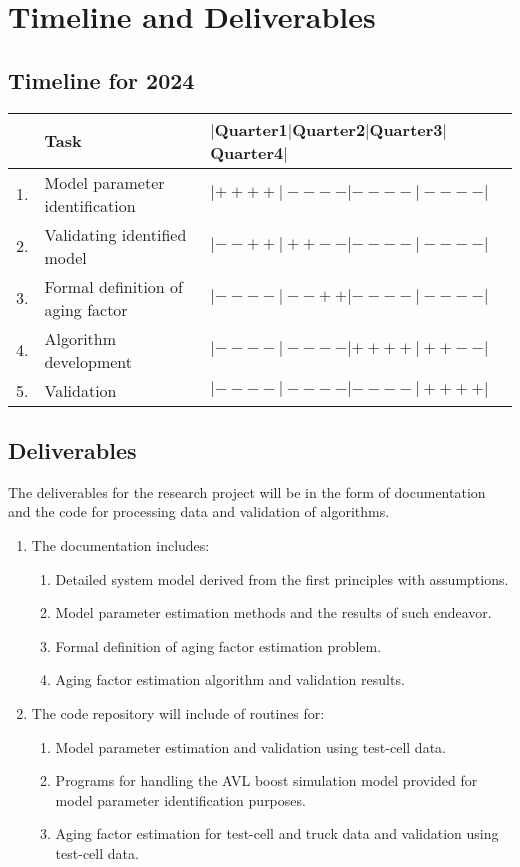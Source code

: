 \section{Timeline and Deliverables}
\subsection{Timeline for 2024}

\begin{table}[H]
    \centering
    \begin{tabular}{l l l}
        \hline\hline
                & Task & $|$Quarter1$|$Quarter2$|$Quarter3$|$Quarter4$|$ \\\hline\hline
        1.      & Model parameter identification   & $|++++|----|----|----|$\\
        2.      & Validating identified model      & $|--++|++--|----|----|$\\
        3.      & Formal definition of aging factor& $|----|--++|----|----|$\\
        4.      & Algorithm development            & $|----|----|++++|++--|$\\
        5.      & Validation                       & $|----|----|----|++++|$\\
        \hline\hline
    \end{tabular}
\end{table}
\subsection{Deliverables}
The deliverables for the research project will be in the form of documentation
and the code for processing data and validation of algorithms.

\begin{enumerate}
    \item The documentation includes:
\begin{enumerate}
    \item Detailed system model derived from the first principles with assumptions.
    \item Model parameter estimation methods and the results of such endeavor.
    \item Formal definition of aging factor estimation problem.
    \item Aging factor estimation algorithm and validation results.
\end{enumerate}

\item The code repository will include of routines for:
\begin{enumerate}
    \item Model parameter estimation and validation using test-cell data.
\item Programs for handling the AVL boost simulation model provided for model
parameter identification purposes.
\item Aging factor estimation for test-cell and truck data and validation using
test-cell data.
\end{enumerate}

\end{enumerate}
